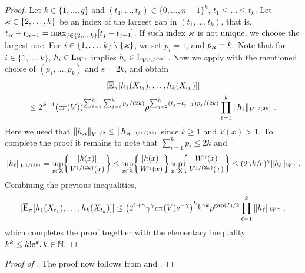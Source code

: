 \begin{proof}
  Let $k \in \{1,\ldots,q\}$ and
 $(t_1,\dots,t_{k}) \in \{0,\ldots,n-1\}^{k}$, $t_1 \leq \dots\leq t_{k}$.
Let $\varkappa \in \{2,\ldots,k\}$ be an index of the largest gap in $(t_1,\dots,t_{k})$, that is, $t_{\varkappa} - t_{\varkappa-1} = \max_{j \in \{2,\ldots,k\}} [t_j - t_{j-1}]$. If such index $\varkappa$ is not unique, we choose the largest one. For $i \in \{1,\ldots,k\} \setminus \{\varkappa\}$, we set $p_{i} = 1$, and $p_{\varkappa} = k$. Note that for $i \in \{1,\dots,k\}$, $h_i \in \mathrm{L}_{W^{\gamma}}$ implies $h_i \in \mathrm{L}_{V^{p_i/(2k)}}$.
Now we apply  with the mentioned choice of $(p_1,\dots, p_k)$ and $s = 2k$, and obtain
\begin{multline*}
|\overline{\mathrm{E}}_\pi[h_1(X_{t_1}), \ldots, h_k(X_{t_k})] |
\\\leq 2^{k-1}  (c \pi(V))^{\sum_{\ell=1}^k\sum_{j=\ell}^k p_{j}/(2k)} \rho^{\sum_{j=2}^{k}(t_j - t_{j-1})p_{j}/(2k)} \prod_{\ell = 1}^k   \|h_\ell\|_{V^{1/(2k)}} \;.
\end{multline*}
Here we used that $\|h_{\varkappa}\|_{V^{1/2}} \leq \|h_{\varkappa}\|_{V^{1/(2k)}}$ since $k \geq 1$ and $V(x) > 1$. To complete the proof it remains to note that $\sum_{i=1}^k p_i \leq 2k$ and
\begin{align*}
\|h_\ell\|_{V^{1/(2k)}}
= \sup_{x \in \mathsf{X}}\biggl\{\frac{|h(x)|}{V^{1/(2k)}(x)}\biggr\} \leq \sup_{x \in \mathsf{X}}\biggl\{\frac{|h(x)|}{W^{\gamma}(x)}\biggr\} \sup_{x \in \mathsf{X}}\biggl\{\frac{W^{\gamma}(x)}{V^{1/(2k)}(x)}\biggr\} \leq (2\gamma k / \mathrm{e})^{\gamma}\|h_\ell\|_{W^{\gamma}}\;.
\end{align*}
Combining the previous inequalities,
\begin{align*}
|\overline{\mathrm{E}}_\pi[h_1(X_{t_1}), \ldots, h_k(X_{t_k})] | \leq \bigl(2^{1+\gamma}\gamma^{\gamma}c\pi(V)\mathrm{e}^{-\gamma}\bigr)^{k}k^{\gamma k}\rho^{\operatorname{gap}(I)/2} \prod_{\ell = 1}^k   \|h_\ell\|_{W^{\gamma}}\;,
\end{align*}
which completes the proof together with the elementary inequality $k^{k} \leq k!\mathrm{e}^{k}, k \in \mathbb{N}$.
\end{proof}

\begin{proof}[Proof of ] The proof now follows from  and .
\end{proof}



